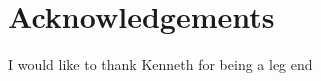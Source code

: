 \chapter*{Acknowledgements}

I would like to thank Kenneth for being a leg end

\begin{comment}

Attempting to complete a PhD has been a great undertaking, and in completing
this thesis I am nearing the end of an important chapter in my life.  The years
I have spent as a postgraduate researcher have probably been the happiest of my
life, but at times the work involved has been tough, and without the support of
people around me I certainly couldn't have made it this far.  Almost everyone I
have met and got to know during this period has touched my life in a positive
way, but there are a few people in particular that I wish to thank.

Firstly, I would like to thank my supervisor James D.~Mitchell, for his honesty
and friendliness, and for the many hours he has spent correcting my work and
making me a better mathematician.  Secondly, I would like to thank my friend and
office-mate Wilf Wilson, whose wonderful company has kept me from falling asleep
through many weary afternoons of writing and coding.  I am also indebted to the
Engineering and Physical Sciences Research Council (EPSRC), whose generous grant
has allowed me to pursue computational semigroup theory freely for the last four
years.

Finally, I wish to thank Claire Young.  She has been the most important part of
my life throughout my postgraduate career, and her love and support during the
tougher moments of this PhD have given me the motivation to overcome what
sometimes felt like insurmountable obstacles.

\begin{flushright}
  Michael Torpey

  \singlespacing
  \textit{St Andrews \\July 2018}
\end{flushright}

\vspace{2.0em}
\noindent
Having completed the final version of this thesis, I also wish to thank my
examiners Martyn Quick and Wolfram Bentz, for the time and effort they spent
reading my work, conducting my viva, and providing the detailed feedback that
helped me improve this thesis to its current state.

\begin{flushright}
  Michael Torpey

  \singlespacing
  \textit{St Andrews \\February 2019}
\end{flushright}

\end{comment}

